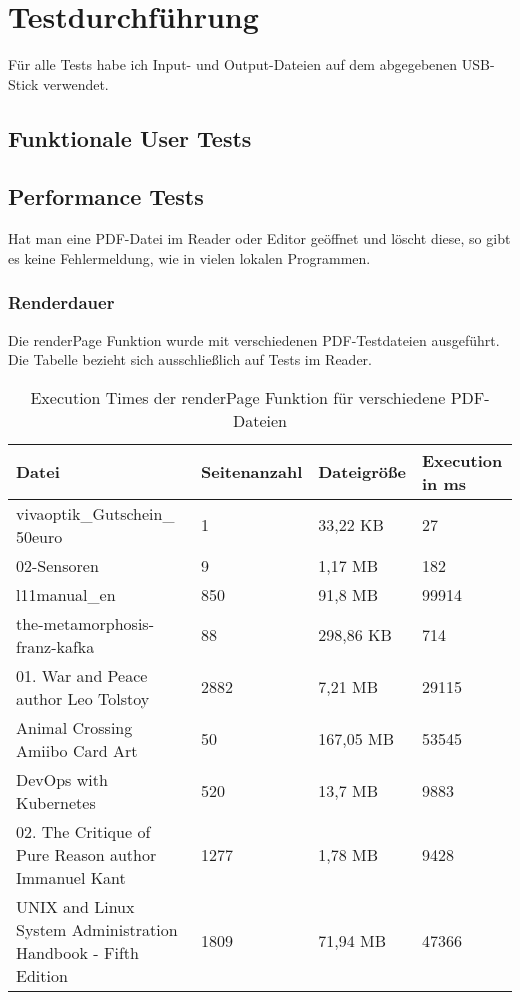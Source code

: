 \section{Testdurchführung}
Für alle Tests habe ich Input- und Output-Dateien auf dem abgegebenen USB-Stick verwendet.

\subsection{Funktionale User Tests}

\subsection{Performance Tests}
Hat man eine PDF-Datei im Reader oder Editor geöffnet und löscht diese, so gibt es keine Fehlermeldung, wie in vielen lokalen Programmen.

\subsubsection{Renderdauer}
Die renderPage Funktion wurde mit verschiedenen PDF-Testdateien ausgeführt. Die Tabelle bezieht sich ausschließlich auf Tests im Reader. 

\begin{table}[!htbp]
	\centering
	\begin{tabular}{|p{4cm}|p{3cm}|p{3cm}|p{3cm}|}
		\hline
		\textbf{Datei}													& \textbf{Seitenanzahl} 	& \textbf{Dateigröße} 	& \textbf{Execution in ms}	\\ 
		\hline
		\parbox[t]{4cm}{vivaoptik\_Gutschein\_\\50euro}					& 1 						& 33,22 KB  			& 27						\\ 
		02-Sensoren														& 9 						& 1,17 MB  				& 182						\\ 
		l11manual\_en 													& 850 						& 91,8 MB  				& 99914						\\
		the-metamorphosis-franz-kafka 									& 88 						& 298,86 KB  			& 714						\\ 
		01. War and Peace author Leo Tolstoy 							& 2882 						& 7,21 MB  				& 29115						\\ 
		Animal Crossing Amiibo Card Art									& 50 						& 167,05 MB  			& 53545						\\  
		DevOps with Kubernetes											& 520 						& 13,7 MB  				& 9883						\\  
		02. The Critique of Pure Reason author Immanuel Kant			& 1277 						& 1,78 MB  				& 9428						\\  
		UNIX and Linux System Administration Handbook - Fifth Edition	& 1809						& 71,94 MB  			& 47366						\\ 
		\hline
	\end{tabular}
	\caption{Execution Times der renderPage Funktion für verschiedene PDF-Dateien}
	\label{table:render-dur}
\end{table}

